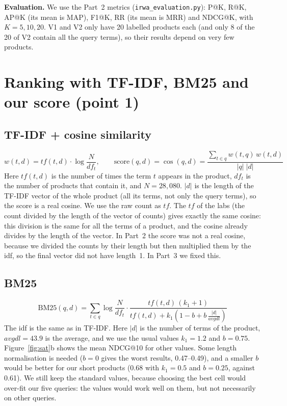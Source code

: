 \documentclass[11pt,a4paper]{article}
\begin{document}
\textbf{Evaluation.} We use the Part~2 metrics (\texttt{irwa\_evaluation.py}): P@K, R@K, AP@K (its mean is MAP), F1@K,
RR (its mean is MRR) and NDCG@K, with $K = 5, 10, 20$. V1 and V2 only have 20 labelled products each (and only 8 of the
20 of V2 contain all the query terms), so their results depend on very few products.

\section{Ranking with TF-IDF, BM25 and our score (point 1)}

\subsection{TF-IDF + cosine similarity}
\[
w(t,d) = tf(t,d)\cdot \log\frac{N}{df_t}, \qquad
\text{score}(q,d) = \cos(q,d) = \frac{\sum_{t\in q} w(t,q)\,w(t,d)}{|q|\;|d|}
\]
Here $tf(t,d)$ is the number of times the term $t$ appears in the product, $df_t$ is the number of products that
contain it, and $N = 28{,}080$. $|d|$ is the length of the TF-IDF vector of the whole product (all its terms, not only
the query terms), so the score is a real cosine. We use the raw count as $tf$. The $tf$ of the labs (the count divided
by the length of the vector of counts) gives exactly the same cosine: this division is the same for all the terms of a
product, and the cosine already divides by the length of the vector. In Part~2 the score was not a real cosine,
because we divided the counts by their length but then multiplied them by the idf, so the final vector did not have
length~1. In Part~3 we fixed this.

\subsection{BM25}
\[
\text{BM25}(q,d) = \sum_{t\in q} \log\frac{N}{df_t}\cdot \frac{tf(t,d)\,(k_1+1)}{tf(t,d) + k_1\left(1 - b + b\,\frac{|d|}{avgdl}\right)}
\]
The idf is the same as in TF-IDF. Here $|d|$ is the number of terms of the product, $avgdl = 43.9$ is the average, and we
use the usual values $k_1 = 1.2$ and $b = 0.75$. Figure~\ref{fig:sat}b shows the mean NDCG@10 for other values. Some
length normalisation is needed ($b = 0$ gives the worst results, 0.47--0.49), and a smaller $b$ would be better for our
short products (0.68 with $k_1 = 0.5$ and $b = 0.25$, against 0.61). We still keep the standard values, because choosing the
best cell would over-fit our five queries: the values would work well on them, but not necessarily on other queries.
\end{document}
